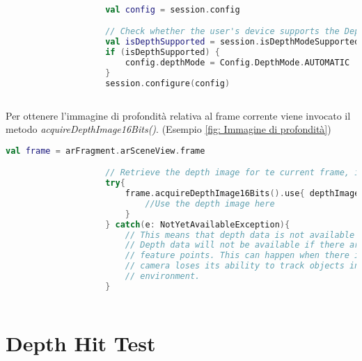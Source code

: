 \documentclass[crop=false, class=book]{standalone}
\begin{document}
			\begin{center}
				\begin{minipage}{0.95\textwidth}
					\begin{lstlisting}[caption={ Controllo supporto depth API}, label={lst: Controllo supporto depth API}, 		language=Kotlin]
				
					val config = session.config

					// Check whether the user's device supports the Depth API.
					val isDepthSupported = session.isDepthModeSupported(Config.DepthMode.AUTOMATIC)
					if (isDepthSupported) {
  						config.depthMode = Config.DepthMode.AUTOMATIC
					}
					session.configure(config)
				
					\end{lstlisting}
			\end{minipage}
		\end{center}
		
		\begin{flushleft}
		Per ottenere l'immagine di profondità relativa al frame corrente viene invocato il metodo 										\textit{acquireDepthImage16Bits()}. (Esempio \vref{fig: Immagine di profondità})\\
		\end{flushleft}
		
		
		\begin{center}
				\begin{minipage}{0.95\textwidth}
					\begin{lstlisting}[caption={ Controllo supporto depth API}, label={lst: Controllo supporto depth API}, 		language=Kotlin]
					val frame = arFragment.arSceneView.frame

					// Retrieve the depth image for te current frame, if available
					try{
						frame.acquireDepthImage16Bits().use{ depthImage ->
							//Use the depth image here
						}
					} catch(e: NotYetAvailableException){
						// This means that depth data is not available yet.
  						// Depth data will not be available if there are no tracked
  						// feature points. This can happen when there is no motion, or when the
  						// camera loses its ability to track objects in the surrounding
  						// environment. 
					}
					
					\end{lstlisting}
			\end{minipage}
		\end{center}
		
		\section{Depth Hit Test}
		
\end{document}
